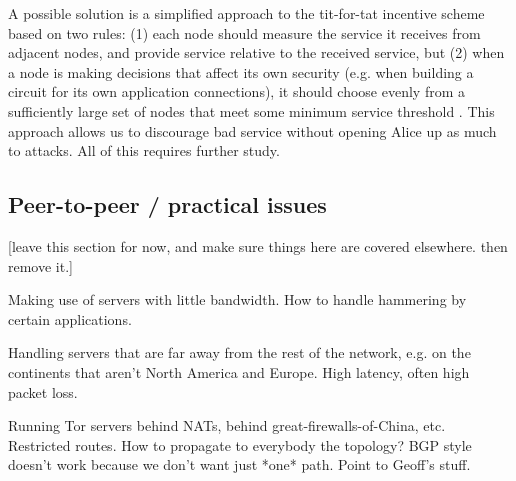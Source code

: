 \documentclass{llncs}
\begin{document}

A possible solution is a simplified approach to the tit-for-tat
incentive scheme based on two rules: (1) each node should measure the
service it receives from adjacent nodes, and provide service relative
to the received service, but (2) when a node is making decisions that
affect its own security (e.g. when building a circuit for its own
application connections), it should choose evenly from a sufficiently
large set of nodes that meet some minimum service threshold
\cite{casc-rep}.  This approach allows us to discourage bad service
without opening Alice up as much to attacks.  All of this requires
further study.




\subsection{Peer-to-peer / practical issues}

[leave this section for now, and make sure things here are covered
elsewhere. then remove it.]

Making use of servers with little bandwidth. How to handle hammering by
certain applications.

Handling servers that are far away from the rest of the network, e.g. on
the continents that aren't North America and Europe. High latency,
often high packet loss.

Running Tor servers behind NATs, behind great-firewalls-of-China, etc.
Restricted routes. How to propagate to everybody the topology? BGP
style doesn't work because we don't want just *one* path. Point to
Geoff's stuff.
\end{document}
